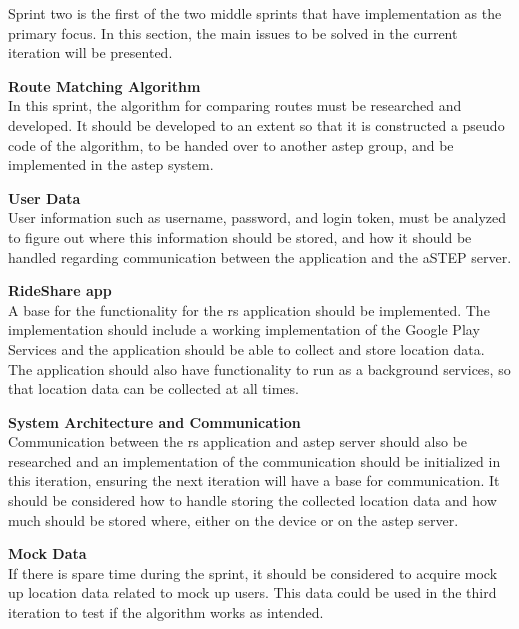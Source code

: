 Sprint two is the first of the two middle sprints that have implementation as the primary focus. In this section, the main issues to be solved in the current iteration will be presented.

\textbf{Route Matching Algorithm}\\
In this sprint, the algorithm for comparing routes must be researched and developed. 
It should be developed to an extent so that it is constructed a pseudo code of the algorithm, to be handed over to another \gls{astep} group, and be implemented in the \gls{astep} system.

\textbf{User Data}\\
User information such as username, password, and login token, must be analyzed to figure out where this information should be stored, and how it should be handled regarding communication between the application and the aSTEP server. 

\textbf{RideShare app}\\
A base for the functionality for the \gls{rs} application should be implemented. 
The implementation should include a working implementation of the Google Play Services and the application should be able to collect and store location data. 
The application should also have functionality to run as a background services, so that location data can be collected at all times.

\textbf{System Architecture and Communication}\\
Communication between the \gls{rs} application and \gls{astep} server should also be researched and an implementation of the communication should be initialized in this iteration, ensuring the next iteration will have a base for communication. 
It should be considered how to handle storing the collected location data and how much should be stored where, either on the device or on the \gls{astep} server.

\textbf{Mock Data}\\
If there is spare time during the sprint, it should be considered to acquire mock up location data related to mock up users. 
This data could be used in the third iteration to test if the algorithm works as intended.